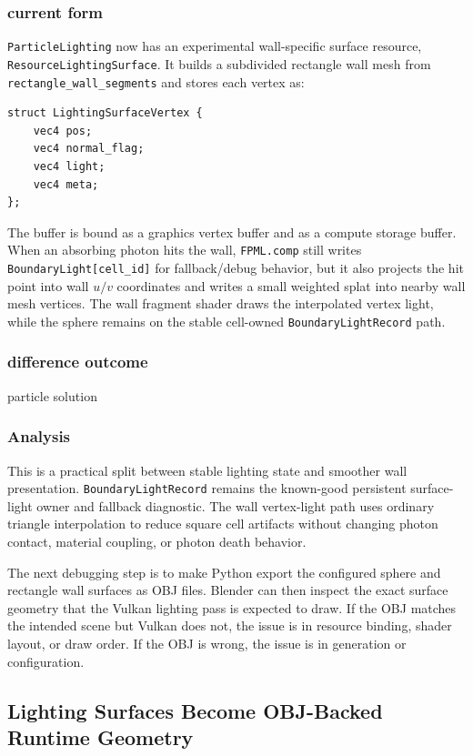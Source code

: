 \subsubsection{current form}

\texttt{ParticleLighting} now has an experimental wall-specific surface
resource, \texttt{ResourceLightingSurface}.  It builds a subdivided rectangle
wall mesh from \texttt{rectangle\_wall\_segments} and stores each vertex as:
\begin{verbatim}
struct LightingSurfaceVertex {
    vec4 pos;
    vec4 normal_flag;
    vec4 light;
    vec4 meta;
};
\end{verbatim}
The buffer is bound as a graphics vertex buffer and as a compute storage
buffer.  When an absorbing photon hits the wall, \texttt{FPML.comp} still
writes \texttt{BoundaryLight[cell\_id]} for fallback/debug behavior, but it
also projects the hit point into wall \(u/v\) coordinates and writes a small
weighted splat into nearby wall mesh vertices.  The wall fragment shader
draws the interpolated vertex light, while the sphere remains on the stable
cell-owned \texttt{BoundaryLightRecord} path.

\subsubsection{difference outcome}

particle solution

\subsubsection{Analysis}

This is a practical split between stable lighting state and smoother wall
presentation.  \texttt{BoundaryLightRecord} remains the known-good persistent
surface-light owner and fallback diagnostic.  The wall vertex-light path uses
ordinary triangle interpolation to reduce square cell artifacts without
changing photon contact, material coupling, or photon death behavior.

The next debugging step is to make Python export the configured sphere and
rectangle wall surfaces as OBJ files.  Blender can then inspect the exact
surface geometry that the Vulkan lighting pass is expected to draw.  If the
OBJ matches the intended scene but Vulkan does not, the issue is in resource
binding, shader layout, or draw order.  If the OBJ is wrong, the issue is in
generation or configuration.

\subsection{Lighting Surfaces Become OBJ-Backed Runtime Geometry}

